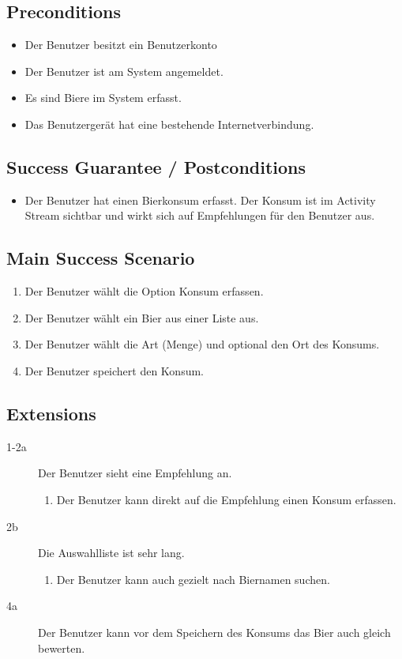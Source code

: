 \documentclass[10pt,a4paper]{scrartcl}
\begin{document}
\subsection*{Preconditions}

\begin{itemize}
\item Der Benutzer besitzt ein Benutzerkonto
\item Der Benutzer ist am System angemeldet.
\item Es sind Biere im System erfasst.
\item Das Benutzergerät hat eine bestehende Internetverbindung.
\end{itemize}


\subsection*{Success Guarantee / Postconditions}
\begin{itemize}
\item Der Benutzer hat einen Bierkonsum erfasst. Der Konsum ist im Activity Stream sichtbar und wirkt sich auf Empfehlungen für den Benutzer aus.
\end{itemize}


\subsection*{Main Success Scenario}

\begin{enumerate}
\item Der Benutzer wählt die Option Konsum erfassen.
\item Der Benutzer wählt ein Bier aus einer Liste aus.
\item Der Benutzer wählt die Art (Menge) und optional den Ort des Konsums.
\item Der Benutzer speichert den Konsum.
\end{enumerate}


\subsection*{Extensions}

\begin{description}
\item[1-2a] Der Benutzer sieht eine Empfehlung an.
	\begin{enumerate}
	\item Der Benutzer kann direkt auf die Empfehlung einen Konsum erfassen.
	\end{enumerate}
\item[2b] Die Auswahlliste ist sehr lang.
	\begin{enumerate}
	\item Der Benutzer kann auch gezielt nach Biernamen suchen.
	\end{enumerate}
\item[4a] Der Benutzer kann vor dem Speichern des Konsums das Bier auch gleich bewerten.
\end{description}
\end{document}
